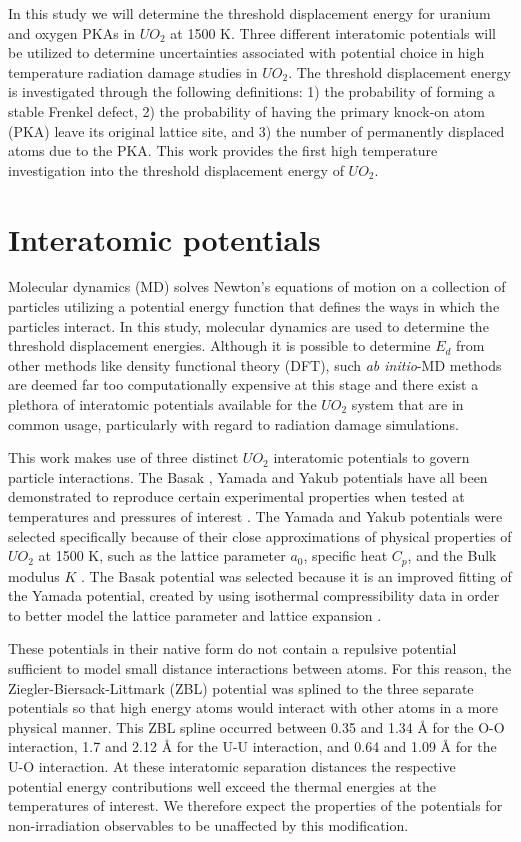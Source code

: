 \documentclass[8pt]{article}   	%
\begin{document}
In this study we will determine the threshold displacement energy for uranium and oxygen PKAs in $UO_2$ at 1500 K. Three different interatomic potentials will be utilized to determine uncertainties associated with potential choice in high temperature radiation damage studies in $UO_2$. The threshold displacement energy is investigated through the following definitions: 1) the probability of forming a stable Frenkel defect, 2) the probability of having the primary knock-on atom (PKA) leave its original lattice site, and 3) the number of permanently displaced atoms due to the PKA. This work provides the first high temperature investigation into the threshold displacement energy of $UO_2$.

\section{Interatomic potentials}

\hspace{5mm}
Molecular dynamics (MD) solves Newton's equations of motion on a collection of particles utilizing a potential energy function that defines the ways in which the particles interact. In this study, molecular dynamics are used to determine the threshold displacement energies. Although it is possible to determine $E_d$ from other methods like density functional theory (DFT), such \textit{ab initio}-MD methods are deemed far too computationally expensive at this stage and there exist a plethora of interatomic potentials available for the $UO_2$ system that are in common usage, particularly with regard to radiation damage simulations.

This work makes use of three distinct $UO_2$ interatomic potentials to govern particle interactions. The Basak \cite{basak}, Yamada\cite{yamada} and Yakub \cite{yakub} potentials have all been demonstrated to reproduce certain experimental properties when tested at temperatures and pressures of interest \cite{govers1,govers2,potashnikov}. The Yamada and Yakub potentials were selected specifically because of their close approximations of physical properties of $UO_2$ at 1500 K, such as the lattice parameter $a_0$, specific heat $C_p$, and the Bulk modulus $K$ \cite{govers2}. The Basak potential was selected because it is an improved fitting of the Yamada potential, created by using isothermal compressibility data in order to better model the lattice parameter and lattice expansion \cite{basak}.

These potentials in their native form do not contain a repulsive potential sufficient to model small distance interactions between atoms. For this reason, the Ziegler-Biersack-Littmark (ZBL) \cite{ZBL} potential was splined to the three separate potentials so that high energy atoms would interact with other atoms in a more physical manner. This ZBL spline occurred between 0.35 and 1.34 {\AA} for the O-O interaction, 1.7 and 2.12  {\AA} for the U-U interaction, and 0.64 and 1.09  {\AA} for the U-O interaction. At these interatomic separation distances the respective potential energy contributions well exceed the thermal energies at the temperatures of interest. We therefore expect the properties of the potentials for non-irradiation observables to be unaffected by this modification.
\end{document}

